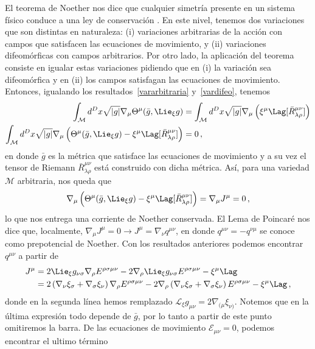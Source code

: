 \documentclass[../Main.tex]{subfiles}
\begin{document}
El teorema de Noether nos dice que cualquier simetría presente en un sistema físico conduce a una ley de conservación \cite{Noether1918}. En este nivel, tenemos dos variaciones que son distintas en naturaleza: (i) variaciones arbitrarias de la acción con campos que satisfacen las ecuaciones de movimiento, y (ii) variaciones difeomórficas con campos arbitrarios. Por otro lado, la aplicación del teorema consiste en igualar estas variaciones pidiendo que en (i) la variación sea difeomórfica y en (ii) los campos satisfagan las ecuaciones de movimiento. Entonces, igualando los resultados~\eqref{vararbitraria} y~\eqref{vardifeo}, tenemos
\begin{align} \notag
\int_{\mathcal{M}} d^{D} x \sqrt{|g|} \nabla_{\mu} \Theta^{\mu}(\bar{g},\Lie_{\xi}g)&=\int_{\mathcal{M}} d^{D}x \sqrt{\lvert g\rvert}\nabla_{\mu}\left(\xi^{\mu}\Lag[\bar{R}^{\mu\nu}_{\lambda\rho}]\right)\\
\int_{\mathcal{M}} d^{D} x \sqrt{|g|}\nabla_{\mu}\left(\Theta^{\mu}(\bar{g},\Lie_{\xi}g)-\xi^{\mu}\Lag[\bar{R}^{\mu\nu}_{\lambda\rho}]\right)&=0 \, ,
\end{align}
en donde $\bar{g}$ es la métrica que satisface las ecuaciones de movimiento y a su vez el tensor de Riemann $\bar{R}^{\mu\nu}_{\lambda\rho}$ está construido con dicha métrica.
Así, para una variedad ${\mathcal{M}}$ arbitraria, nos queda que
\begin{align}
\nabla_{\mu}\left(\Theta^{\mu}(\bar{g},\Lie_{\xi}g)-\xi^{\mu}\Lag[\bar{R}^{\mu\nu}_{\lambda\rho}]\right)=\nabla_{\mu}J^{\mu}=0\, ,\label{conscorr}
\end{align}
lo que nos entrega una corriente de Noether conservada. El Lema de Poincaré nos dice que, localmente, $\nabla_{\mu}J^{\mu}=0\to J^{\mu}=\nabla_{\nu}q^{\mu\nu}$, en donde $q^{\mu\nu}=-q^{\nu\mu}$ se conoce como prepotencial de Noether. Con los resultados anteriores podemos encontrar $q^{\mu\nu}$ a partir de 
\begin{align}\notag
    J^{\mu}&=2 \Lie_{\xi}g_{\nu\sigma}\nabla_{\rho} E^{\rho\sigma\mu\nu}-2\nabla_{\rho}\Lie_{\xi}g_{\nu \sigma} E^{\rho\sigma\mu\nu}-\xi^{\mu}\Lag\\
    &=2\left(\nabla_\nu \xi_{\sigma}+\nabla_{\sigma} \xi_{\nu}\right) \nabla_{\rho} E^{\rho \sigma \mu\nu}-2 \nabla_{\rho}\left(\nabla_{\nu} \xi_{\sigma}+\nabla_{\sigma} \xi_{\nu}\right) E^{\rho \sigma \mu\nu}-\xi^{\mu}\Lag\, , \label{corriente}
\end{align}
donde en la segunda línea hemos remplazado $\mathcal{L}_\xi g_{\mu\nu}=2\nabla_{(\mu}\xi_{\nu)}$. Notemos que en la última expresión todo depende de $\bar{g}$, por lo tanto a partir de este punto omitiremos la barra. De las ecuaciones de movimiento $\mathcal{E}_{\mu\nu}=0$, podemos encontrar el ultimo término 
\end{document}

